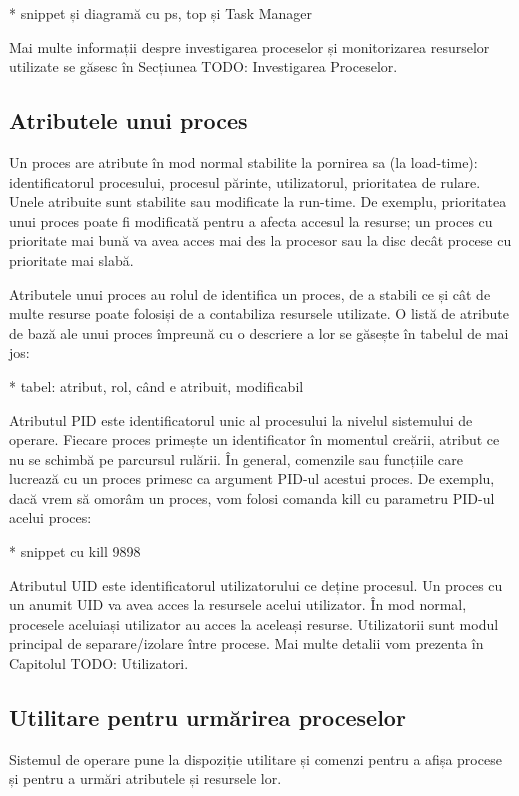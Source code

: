 * snippet și diagramă cu ps, top și Task Manager

Mai multe informații despre investigarea proceselor și monitorizarea resurselor
utilizate se găsesc în Secțiunea TODO: Investigarea Proceselor.

\subsection{Atributele unui proces}

Un proces are atribute în mod normal stabilite la pornirea sa (la load-time):
identificatorul procesului, procesul părinte, utilizatorul, prioritatea de
rulare. Unele atribuite sunt stabilite sau modificate la run-time. De exemplu,
prioritatea unui proces poate fi modificată pentru a afecta accesul la resurse;
un proces cu prioritate mai bună va avea acces mai des la procesor sau la disc
decât procese cu prioritate mai slabă.

Atributele unui proces au rolul de identifica un proces, de a stabili ce și cât
de multe resurse poate folosiși de a contabiliza resursele utilizate. O listă de
atribute de bază ale unui proces împreună cu o descriere a lor se găsește în
tabelul de mai jos:

* tabel: atribut, rol, când e atribuit, modificabil

Atributul PID este identificatorul unic al procesului la nivelul sistemului de
operare. Fiecare proces primește un identificator în momentul creării, atribut
ce nu se schimbă pe parcursul rulării. În general, comenzile sau funcțiile care
lucrează cu un proces primesc ca argument PID-ul acestui proces. De exemplu,
dacă vrem să omorâm un proces, vom folosi comanda kill cu parametru PID-ul
acelui proces:

* snippet cu kill 9898

Atributul UID este identificatorul utilizatorului ce deține procesul. Un proces
cu un anumit UID va avea acces la resursele acelui utilizator. În mod normal,
procesele aceluiași utilizator au acces la aceleași resurse. Utilizatorii sunt
modul principal de separare/izolare între procese. Mai multe detalii vom
prezenta în Capitolul TODO: Utilizatori.

\subsection{Utilitare pentru urmărirea proceselor}

Sistemul de operare pune la dispoziție utilitare și comenzi pentru a afișa
procese și pentru a urmări atributele și resursele lor.

